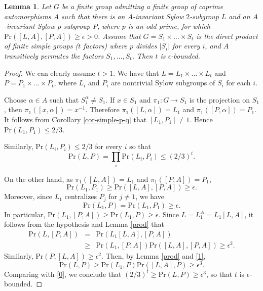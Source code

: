 \documentclass[12pt]{amsart}
\newtheorem{lemma}[theorem]{\bf Lemma}
\newcommand{\al }{\alpha }
\newcommand{\pr }{\mathrm{Pr} }
\newcommand{\ep}{\epsilon}
\begin{document}
 \begin{lemma}\label{transitive} 
 Let $G$ be a finite group admitting a finite group of coprime automorphisms $A$  such that there is an $A$-invariant Sylow $2$-subgroup 
$L$ and an $A$-invariant Sylow $p$-subgroup $P$, where $p$ is an odd prime, for which $\pr([L,A],[P,A]) \ge \ep >0$. 
   Assume that $G=S_1\times\dots\times S_t$ is the direct product of finite simple groups ($t$ factors) where $p$ divides $|S_i|$ for every $i$, and $A $ transitively permutes the factors $S_1, \dots , S_t$. Then $t$ is $\ep$-bounded. 
\end{lemma} 
\begin{proof} 
We can clearly assume $t > 1$.  
We have that $L=L_1\times\dots\times L_t$ and  $P=P_1\times\dots\times P_t$, where 
 $L_i$ and $P_i$ are nontrivial Sylow subgroups of  $S_i$ for each $i$. 

Choose $\al \in A$ such that $S_1^\al \neq S_1$. 
If $x \in S_1$ and $\pi_1: G \rightarrow S_1$ is the projection on $S_1$, then $\pi_1 ([x,\al])=x^{-1}$. Therefore
$\pi_1 ([L,\al])=L_1$ and $\pi_1 ([P,\al])=P_1$.  
It follows from Corollary \ref{cor-simple-p-q} that $[L_1,P_1] \neq 1$. Hence $\pr (L_1, P_1) \le 2/3$. 

Similarly, $ \pr(L_i, P_i) \le  2/3$ for every $i$ so that
\begin{equation}\label{0}
 \pr(L,P) = \prod_i  \pr (L_i, P_i) \le (2/3)^t .  
\end{equation}

On the other hand, as $\pi_1 ([L,A])=L_1$ and $\pi_1 ([P,A])=P_1$, 
\[ \pr (L_1, P_1) \ge \pr( [L,A],[P,A])\ge \ep. \] 
Moreover, since $L_1$ centralizes $P_j$ for $j\neq 1$, we have 
\begin{equation}\label{1}
 \pr(L_1 ,P) =   \pr (L_1, P_1)\ge \ep.  
\end{equation}
In particular, 
$ \pr(L_1 ,[P, A]) \ge    \pr (L_1, P)\ge \ep .$ 
Since $L= L_1 ^A= L_1 [L,A]$, it follows from the hypothesis and  Lemma \ref{prod} that 
\begin{eqnarray*}  \pr(L ,[P, A]) &=& \pr(L_1 [L,A] ,[P, A])\\
 &\ge& \pr(L_1  ,[P, A]) \pr( [L,A] ,[P, A]) \ge \ep^2.\end{eqnarray*}
Similarly, $   \pr(P ,[L, A])\ge \ep^2$. 
Then,  by Lemma \ref{prod} and \eqref{1}, 
\[  \pr(L , P) \ge  \pr(L_1 ,P) \pr([L, A], P) \ge \ep^3.\] 
Comparing with \eqref{0}, we conclude that $(2/3)^t \ge  \pr(L , P)  \ge \ep^3$, so that $t$ is $\ep$-bounded. 
\end{proof}
\end{document}
